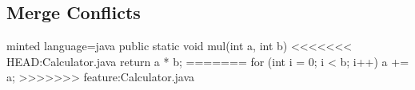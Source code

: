 \subsection*{Merge Conflicts}
\begin{frame}[fragile, c]
    \slidehead
    \vspace{1em}
    \begin{codeBlock}[]{minted language=java}
        public static void mul(int a, int b) {
            <<<<<<< HEAD:Calculator.java
            return a * b;
            =======
            for (int i = 0; i < b; i++) {
                a += a;
            }
            >>>>>>> feature:Calculator.java
        }
    \end{codeBlock}
\end{frame}
